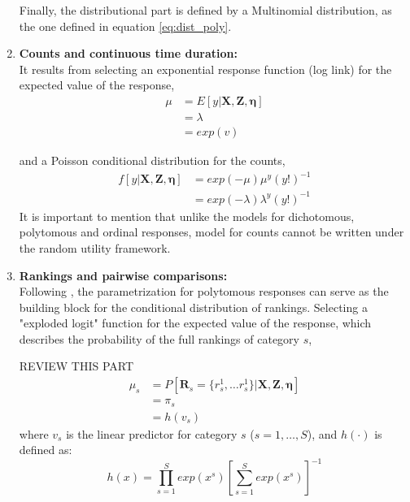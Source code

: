 \begin{enumerate}
	Finally, the distributional part is defined by a Multinomial distribution, as the one defined in equation \ref{eq:dist_poly}.
	
	
	
	\item \textbf{Counts and continuous time duration:} \\
	It results from selecting an exponential response function (log link) for the expected value of the response,
	\begin{equation} \label{eq:link_count}
		\begin{split}
		\mu &= E[y | \mathbf{X}, \mathbf{Z}, \pmb{\eta}] \\
		&= \lambda \\
		&= exp(v)
		\end{split}
	\end{equation}
	
	and a Poisson conditional distribution for the counts,
	\begin{equation} \label{eq:dist_count}
		\begin{split}
		f[y| \mathbf{X}, \mathbf{Z}, \pmb{\eta}] &= exp(-\mu) \mu^{y} (y!)^{-1} \\
		&= exp(-\lambda) \lambda^{y} (y!)^{-1}
		\end{split}
	\end{equation}
	It is important to mention that unlike the models for dichotomous, polytomous and ordinal responses, model for counts cannot be written under the random utility framework.
	
	
	
	\item \textbf{Rankings and pairwise comparisons:} \\
	Following \citet{Skrondal_et_al_2003a}, the parametrization for polytomous responses can serve as the building block for the conditional distribution of rankings. Selecting a "exploded logit" function \citep{Chapaaan_et_al_1982} for the expected value of the response, which describes the probability of the full rankings of category $s$,
	
	{\color{red} REVIEW THIS PART
	\begin{equation} \label{eq:link_rank}
		\begin{split}
			\mu_{s} &= P[\mathbf{R}_{s}= \{ r_{s}^{1}, \dots r_{s}^{1}\} | \mathbf{X}, \mathbf{Z}, \pmb{\eta}] \\
			& = \pi_{s} \\
			&= h(v_{s})
		\end{split}
	\end{equation}	
	where $v_{s}$ is the linear predictor for category $s$ ($s=1, \dots, S$), and $h(\cdot)$ is defined as:
	\begin{equation} \label{eq:response_rank}
		h(x) = \prod_{s=1}^{S} exp(x^{s})\left[\sum_{s=1}^{S} exp(x^{s})\right]^{-1}
	\end{equation}

}
\end{enumerate}
